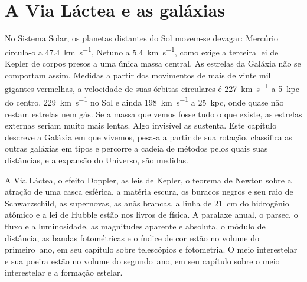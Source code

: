 \chapter{A Via Láctea e as galáxias}\label{ch:b3:milky-way-galaxies}

No Sistema Solar, os planetas distantes do Sol movem-se devagar: Mercúrio
circula-o a \qty{47.4}{km.s^{-1}}, Netuno a \qty{5.4}{km.s^{-1}}, como
exige a terceira lei de Kepler de corpos presos a uma única massa central. As estrelas
da Galáxia não se comportam assim. Medidas a partir dos movimentos de mais de
vinte mil gigantes vermelhas, a velocidade de suas órbitas circulares é
\qty{227}{km.s^{-1}} a \qty{5}{kpc} do centro, \qty{229}{km.s^{-1}}
no Sol e ainda \qty{198}{km.s^{-1}} a \qty{25}{kpc}, onde quase não restam
estrelas nem gás. Se a massa que vemos fosse tudo o que existe, as estrelas externas
seriam muito mais lentas. Algo invisível as sustenta. Este capítulo descreve a Galáxia
em que vivemos, pesa-a a partir de sua rotação, classifica as
outras galáxias em tipos e percorre a cadeia de métodos pelos quais suas
distâncias, e a expansão do Universo, são medidas.

\begin{recall}
A Via Láctea, o efeito Doppler, as leis de Kepler, o teorema de Newton sobre a
atração de uma casca esférica, a matéria escura, os buracos negros e seu
raio de Schwarzschild, as supernovas, as anãs brancas, a linha de 21~cm do
hidrogênio atômico e a lei de Hubble estão nos livros de física. A paralaxe anual,
o parsec, o fluxo e a luminosidade, as magnitudes aparente e absoluta, o
módulo de distância, as bandas fotométricas e o índice de cor estão no
volume do primeiro~ano, em seu capítulo sobre telescópios e fotometria. O
meio interestelar e sua poeira estão no volume do segundo~ano, em seu capítulo
sobre o meio interestelar e a formação estelar.
\end{recall}


